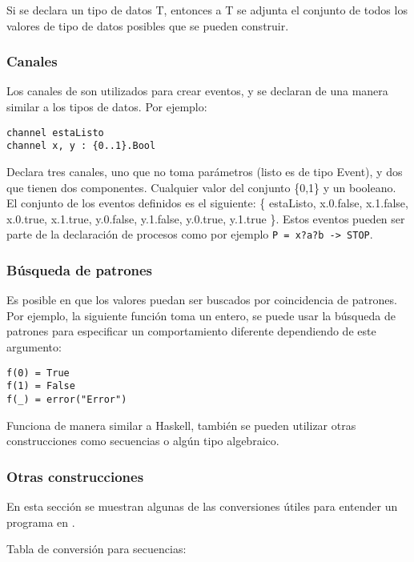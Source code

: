Si se declara un tipo de datos T, entonces a T se adjunta el conjunto de todos los valores de tipo de datos posibles que se pueden construir. 

\subsubsection{Canales}

Los canales de \CSPm son utilizados para crear eventos, y se declaran de una manera similar a los tipos de datos. Por ejemplo:

\begin{lstlisting}[language=cspm, style=sinnumeros]
channel estaListo
channel x, y : {0..1}.Bool
\end{lstlisting}

Declara tres canales, uno que no toma parámetros (listo es de tipo Event), y dos que tienen dos componentes. Cualquier valor del conjunto \{0,1\} y un booleano. El conjunto de los eventos definidos es el siguiente: \{ estaListo, x.0.false, x.1.false, x.0.true, x.1.true, y.0.false, y.1.false, y.0.true, y.1.true \}. Estos eventos pueden ser parte de la declaración de procesos como por ejemplo \lstinline[language=cspm, style=sinnumeros]{P = x?a?b -> STOP}.

\subsubsection{Búsqueda de patrones}

Es posible en \CSP que los valores puedan ser buscados por coincidencia de patrones. Por ejemplo, la siguiente función toma un entero, se puede usar la búsqueda de patrones para especificar un comportamiento diferente dependiendo de este argumento:

\begin{lstlisting}[language=cspm, style=sinnumeros]
f(0) = True
f(1) = False
f(_) = error("Error")
\end{lstlisting}

Funciona de manera similar a Haskell, también se pueden utilizar otras construcciones como secuencias o algún tipo algebraico.

\subsubsection{Otras construcciones}
En esta sección se muestran algunas de las conversiones útiles para entender un programa en \CSPm.

Tabla de conversión para secuencias:

